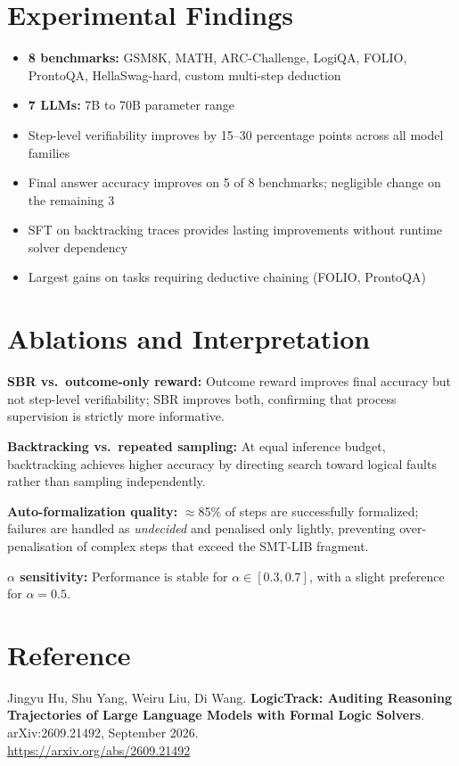 \documentclass[10pt,twocolumn]{article}
\begin{document}
\section{Experimental Findings}

\begin{itemize}[itemsep=2pt,parsep=0pt]
  \item \textbf{8 benchmarks:} GSM8K, MATH, ARC-Challenge, LogiQA,
    FOLIO, ProntoQA, HellaSwag-hard, custom multi-step deduction
  \item \textbf{7 LLMs:} 7B to 70B parameter range
  \item Step-level verifiability improves by 15--30 percentage points
    across all model families
  \item Final answer accuracy improves on 5 of 8 benchmarks;
    negligible change on the remaining 3
  \item SFT on backtracking traces provides lasting improvements without
    runtime solver dependency
  \item Largest gains on tasks requiring deductive chaining (FOLIO, ProntoQA)
\end{itemize}

\section{Ablations and Interpretation}

\textbf{SBR vs.\ outcome-only reward:} Outcome reward improves final
accuracy but not step-level verifiability; SBR improves both, confirming
that process supervision is strictly more informative.

\textbf{Backtracking vs.\ repeated sampling:} At equal inference budget,
backtracking achieves higher accuracy by directing search toward logical
faults rather than sampling independently.

\textbf{Auto-formalization quality:} $\approx$85\% of steps are
successfully formalized; failures are handled as \emph{undecided} and
penalised only lightly, preventing over-penalisation of complex steps
that exceed the SMT-LIB fragment.

\textbf{$\alpha$ sensitivity:} Performance is stable for
$\alpha \in [0.3, 0.7]$, with a slight preference for $\alpha = 0.5$.

\section*{Reference}

Jingyu Hu, Shu Yang, Weiru Liu, Di Wang.
\textbf{LogicTrack: Auditing Reasoning Trajectories of Large Language
Models with Formal Logic Solvers}.
arXiv:2609.21492, September 2026.\\
\url{https://arxiv.org/abs/2609.21492}
\end{document}
